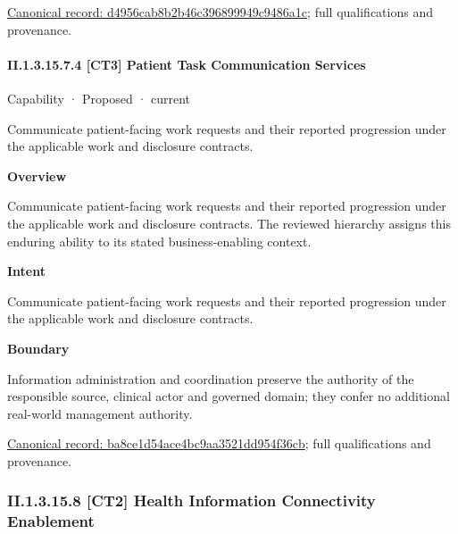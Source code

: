 {\footnotesize \href{../../../../continuum/strategy/capability/d4956cab8b2b46c396899949c9486a1c.md}{Canonical record: d4956cab8b2b46c396899949c9486a1c}; full qualifications and provenance.}\par
\paragraph*{II.1.3.15.7.4 [CT3] Patient Task Communication Services}
\label{navigation:II.1.3.15.7.4}

\label{element:ba8ce1d54ace4bc9aa3521dd954f36cb}
{\small Capability · Proposed · current}\par

Communicate patient-facing work requests and their reported progression under the applicable work and disclosure contracts.



\textbf{Overview}



Communicate patient-facing work requests and their reported progression under the applicable work and disclosure contracts. The reviewed hierarchy assigns this enduring ability to its stated business-enabling context.



\textbf{Intent}



Communicate patient-facing work requests and their reported progression under the applicable work and disclosure contracts.



\textbf{Boundary}



Information administration and coordination preserve the authority of the responsible source, clinical actor and governed domain; they confer no additional real-world management authority.


{\footnotesize \href{../../../../continuum/strategy/capability/ba8ce1d54ace4bc9aa3521dd954f36cb.md}{Canonical record: ba8ce1d54ace4bc9aa3521dd954f36cb}; full qualifications and provenance.}\par
\subsubsection*{II.1.3.15.8 [CT2] Health Information Connectivity Enablement}
\label{navigation:II.1.3.15.8}

